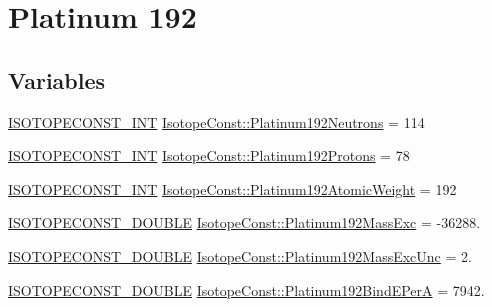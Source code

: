 \hypertarget{group___isotope_const-_platinum-_pt192}{}\section{Platinum 192}
\label{group___isotope_const-_platinum-_pt192}
\subsection*{Variables}
\begin{DoxyCompactItemize}
\item 
\mbox{\hyperlink{group___isotope_const-_macros_ga5f18360b3e99483a35c32d789e62621c}{I\+S\+O\+T\+O\+P\+E\+C\+O\+N\+S\+T\+\_\+\+I\+NT}} \mbox{\hyperlink{group___isotope_const-_platinum-_pt192_ga70fbdbbe2cdc3c0f3fabadf2f6fd9629}{Isotope\+Const\+::\+Platinum192\+Neutrons}} = 114
\item 
\mbox{\hyperlink{group___isotope_const-_macros_ga5f18360b3e99483a35c32d789e62621c}{I\+S\+O\+T\+O\+P\+E\+C\+O\+N\+S\+T\+\_\+\+I\+NT}} \mbox{\hyperlink{group___isotope_const-_platinum-_pt192_ga90ed7a5fb3e2c79c60f74913902179e5}{Isotope\+Const\+::\+Platinum192\+Protons}} = 78
\item 
\mbox{\hyperlink{group___isotope_const-_macros_ga5f18360b3e99483a35c32d789e62621c}{I\+S\+O\+T\+O\+P\+E\+C\+O\+N\+S\+T\+\_\+\+I\+NT}} \mbox{\hyperlink{group___isotope_const-_platinum-_pt192_ga593defed1457669d1988b1de99fdb322}{Isotope\+Const\+::\+Platinum192\+Atomic\+Weight}} = 192
\item 
\mbox{\hyperlink{group___isotope_const-_macros_ga8f45a7272ce02c0b4c65c44636ed719a}{I\+S\+O\+T\+O\+P\+E\+C\+O\+N\+S\+T\+\_\+\+D\+O\+U\+B\+LE}} \mbox{\hyperlink{group___isotope_const-_platinum-_pt192_gab9e917277398964f57ade733d57026d1}{Isotope\+Const\+::\+Platinum192\+Mass\+Exc}} = -\/36288.
\item 
\mbox{\hyperlink{group___isotope_const-_macros_ga8f45a7272ce02c0b4c65c44636ed719a}{I\+S\+O\+T\+O\+P\+E\+C\+O\+N\+S\+T\+\_\+\+D\+O\+U\+B\+LE}} \mbox{\hyperlink{group___isotope_const-_platinum-_pt192_gaabbd829350c1001efea66bbc9084730e}{Isotope\+Const\+::\+Platinum192\+Mass\+Exc\+Unc}} = 2.
\item 
\mbox{\hyperlink{group___isotope_const-_macros_ga8f45a7272ce02c0b4c65c44636ed719a}{I\+S\+O\+T\+O\+P\+E\+C\+O\+N\+S\+T\+\_\+\+D\+O\+U\+B\+LE}} \mbox{\hyperlink{group___isotope_const-_platinum-_pt192_gaf82d89b9f396abeb7baa96bccf661cc7}{Isotope\+Const\+::\+Platinum192\+Bind\+E\+PerA}} = 7942.
\item 

\end{DoxyCompactItemize}
